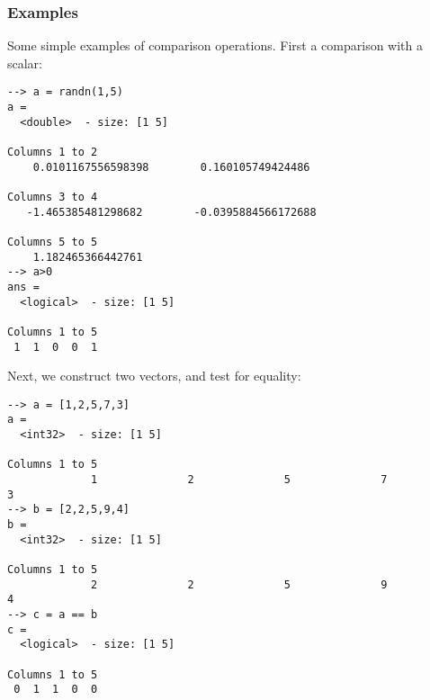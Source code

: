 \subsubsection{Examples}
Some simple examples of comparison operations.  First a comparison with a scalar:
\begin{verbatim}
--> a = randn(1,5)
a =
  <double>  - size: [1 5]
  
Columns 1 to 2
    0.0101167556598398        0.160105749424486
  
Columns 3 to 4
   -1.465385481298682        -0.0395884566172688
  
Columns 5 to 5
    1.182465366442761
--> a>0
ans =
  <logical>  - size: [1 5]
  
Columns 1 to 5
 1  1  0  0  1
\end{verbatim}
Next, we construct two vectors, and test for equality:
\begin{verbatim}
--> a = [1,2,5,7,3]
a =
  <int32>  - size: [1 5]
  
Columns 1 to 5
             1              2              5              7              3
--> b = [2,2,5,9,4]
b =
  <int32>  - size: [1 5]
  
Columns 1 to 5
             2              2              5              9              4
--> c = a == b
c =
  <logical>  - size: [1 5]
  
Columns 1 to 5
 0  1  1  0  0
\end{verbatim}
